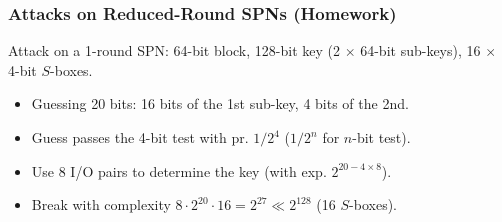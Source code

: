 \begin{frame}\frametitle{Attacks on Reduced-Round SPNs (Homework)}
Attack on a 1-round SPN: 64-bit block, 128-bit key (2 $\times$ 64-bit sub-keys), 16 $\times$ 4-bit $S$-boxes.
\begin{figure}
\begin{center}

\end{center}
\end{figure}
\begin{itemize}
\item Guessing 20 bits: 16 bits of the 1st sub-key, 4 bits of the 2nd.
\item Guess passes the 4-bit test with pr. $1/2^4$ ($1/2^n$ for $n$-bit test).
\item Use 8 I/O pairs to determine the key (with exp. $2^{20 - 4\times 8}$).
\item Break with complexity $8\cdot 2^{20} \cdot 16= 2^{27} \ll 2^{128}$ (16 $S$-boxes).
\end{itemize}
\end{frame}
